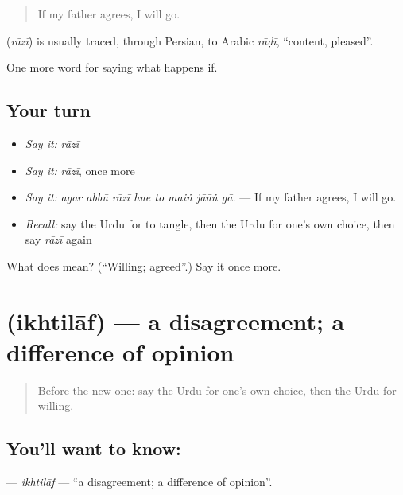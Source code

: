\begin{quote}
If my father agrees, I will go.
\end{quote}

\begin{cousinweb}
\textbf{} (\emph{rāzī}) is usually traced, through Persian, to Arabic \emph{rāḍī}, \textquotedblleft{}content, pleased\textquotedblright{}.
\end{cousinweb}

\begin{grammarlens}[title={What you've built}]
One more word for saying what happens if.
\end{grammarlens}

\subsection*{Your turn}
\begin{itemize}
\raggedright
  \item \emph{Say it:} \emph{rāzī}
  \item \emph{Say it:} \emph{rāzī}, once more
  \item \emph{Say it:} \emph{agar abbū rāzī hue to maiṅ jāūṅ gā.} — If my father agrees, I will go.
  \item \emph{Recall:} say the Urdu for to tangle, then the Urdu for one's own choice, then say \emph{rāzī} again
\end{itemize}

\begin{tcolorbox}[breakable,colback=teal!4,colframe=teal!35!black,title={Before you move on}]
What does  mean? (\textquotedblleft{}Willing; agreed\textquotedblright{}.) Say it once more.
\end{tcolorbox}
\section[\texorpdfstring{\ur{اختلاف} (ikhtilāf)}{اختلاف (ikhtilāf)}]{ (ikhtilāf) — a disagreement; a difference of opinion}

\label{lesson:UR-C530-ikhtilaf}



\begin{quote}
Before the new one: say the Urdu for one's own choice, then the Urdu for willing.
\end{quote}

\subsection*{You'll want to know: }
\textbf{} — \emph{ikhtilāf} — \textquotedblleft{}a disagreement; a difference of opinion\textquotedblright{}.

